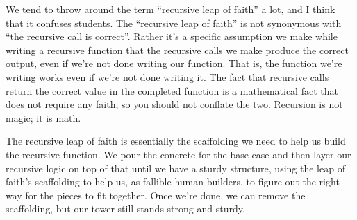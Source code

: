 \begin{meta}
\begin{enumerate}
\begin{itemize}
		\end{itemize}
\end{enumerate}
We tend to throw around the term ``recursive leap of faith'' a lot, and I think that it confuses students. The ``recursive leap of faith'' is not synonymous with ``the recursive call is correct''. Rather it's a specific assumption we make while writing a recursive function that the recursive calls we make produce the correct output, even if we're not done writing our function. That is, the function we're writing works even if we're not done writing it. The fact that recursive calls return the correct value in the completed function is a mathematical fact that does not require any faith, so you should not conflate the two. Recursion is not magic; it is math.

The recursive leap of faith is essentially the scaffolding we need to help us build the recursive function. We pour the concrete for the base case and then layer our recursive logic on top of that until we have a sturdy structure, using the leap of faith's scaffolding to help us, as fallible human builders, to figure out the right way for the pieces to fit together. Once we're done, we can remove the scaffolding, but our tower still stands strong and sturdy. 
\end{meta}
